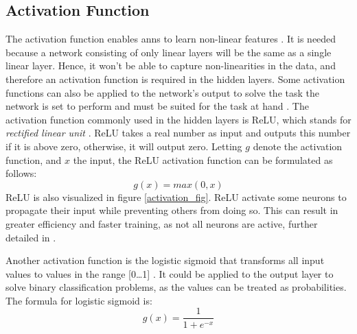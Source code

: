         
    \subsection{Activation Function} \label{activation function}
        The activation function enables \gls{ann}s to learn non-linear features \cite{razavi2021deep_exp_per}. It is needed because a network consisting of only linear layers will be the same as a single linear layer. Hence, it won't be able to capture non-linearities in the data, and therefore an activation function is required in the hidden layers. Some activation functions can also be applied to the network's output to solve the task the network is set to perform and must be suited for the task at hand \cite{Goodfellow-et-al-2016}. The activation function commonly used in the hidden layers is ReLU, which stands for \textit{rectified linear unit} \cite{sharma2019new_activation_func}. ReLU takes a real number as input and outputs this number if it is above zero,  otherwise, it will output zero. Letting $g$ denote the activation function, and $x$ the input, the ReLU activation function can be formulated as follows:
            \begin{equation} \label{relu_eq}
                g(x) = max(0,x)
            \end{equation}
        ReLU is also visualized in figure \ref{activation_fig}. ReLU activate some neurons to propagate their input while preventing others from doing so. This can result in greater efficiency and faster training, as not all neurons are active, further detailed in \citeauthor{sharma2019new_activation_func} \cite{sharma2019new_activation_func}. 
        
        Another activation function is the logistic sigmoid that transforms all input values to values in the range [0…1] \cite{sharma2019new_activation_func}. It could be applied to the output layer to solve binary classification problems, as the values can be treated as probabilities. The formula for logistic sigmoid is:
            \begin{equation} \label{sigmoid_eq}
                g(x) = \dfrac{1}{1 + e^{-x}} 
            \end{equation}
            
